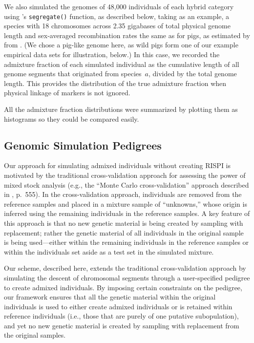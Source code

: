 We also simulated the genomes of 48,000 individuals of each
hybrid category using \gscramble{}'s {\footnotesize\tt segregate()} function, as described
below, taking as an example, a species with 18 chromosomes across 2.35 gigabases of total physical genome length
and sex-averaged recombination rates the same as for pigs, as estimated by from \citet{tortereau2012high}. (We chose
a pig-like genome here, as wild pigs form one of our example empirical data sets for illustration, below.)  In this case, we recorded the
admixture fraction of each simulated individual as the cumulative length of all genome segments
that originated from species~$a$, divided by the total genome length.
This provides the distribution of the true admixture fraction
when physical linkage of markers is not ignored.  

All the admixture fraction distributions were summarized by plotting them as histograms
so they could be compared easily.  


\subsection*{Genomic Simulation Pedigrees}

Our approach for simulating admixed individuals without creating RISPI is motivated by the traditional cross-validation
approach for assessing the power of mixed stock analysis (e.g., the ``Monte Carlo cross-validation'' approach
described in \citealt{moran2019bayesian}, p.~555).
In the cross-validation approach, individuals are removed from the reference
samples and placed in a mixture sample of ``unknowns,'' whose origin
is inferred using the remaining individuals in the reference samples.  A key
feature of this approach is that no new genetic material is being created by
sampling with replacement; rather the genetic material of all individuals
in the original sample is being used---either within the remaining individuals in the
reference samples or within the individuals set aside as a test set in the
simulated mixture.

Our scheme, described here, extends the traditional cross-validation approach
by simulating the descent of chromosomal segments through a user-specified
pedigree to create admixed individuals.  By imposing certain constraints
on the pedigree, our framework ensures that all the genetic material
within the original individuals is used to either create admixed individuals or is retained
within reference individuals (i.e., those that are purely of one
putative subopulation), and yet no new genetic material is
created by sampling with replacement from the original samples.

